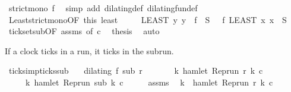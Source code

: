 \begin{isabellebody}
\ {\isacartoucheopen}strict{\isacharunderscore}mono\ f{\isacartoucheclose}\ \isamarkupfalse%
\ {\isacharparenleft}simp\ add{\isacharcolon}\ dilating{\isacharunderscore}def\ dilating{\isacharunderscore}fun{\isacharunderscore}def{\isacharparenright}\isanewline
\ \ \isamarkupfalse%
\ Least{\isacharunderscore}strict{\isacharunderscore}mono{\isacharbrackleft}OF\ this\ least{\isacharbrackright}\ \isamarkupfalse%
\isanewline
\ \ \ \ {\isacartoucheopen}{\isacharparenleft}LEAST\ y{\isachardot}\ y\ {\isasymin}\ f\ {\isacharbackquote}\ {\isacharquery}S{\isacharparenright}\ \ {\isacharequal}\ f\ {\isacharparenleft}LEAST\ x{\isachardot}\ x\ {\isasymin}\ {\isacharquery}S{\isacharparenright}{\isacartoucheclose}\ \isacommand{{\isachardot}}\isamarkupfalse%
\isanewline
\ \ \isamarkupfalse%
\ tick{\isacharunderscore}set{\isacharunderscore}sub{\isacharbrackleft}OF\ assms{\isacharparenleft}{}{\isacharparenright}{\isacharcomma}\ of\ {\isacartoucheopen}c{\isacartoucheclose}{\isacharbrackright}\ \isamarkupfalse%
\ {\isacharquery}thesis\ \isamarkupfalse%
\ auto\isanewline
{}\isamarkupfalse%
%
\endisatagproof
{\isafoldproof}%
%
\isadelimproof
%
\endisadelimproof
%
\begin{isamarkuptext}%
If a clock ticks in a run, it ticks in the subrun.%
\end{isamarkuptext}\isamarkuptrue%
\isamarkupfalse%
\ ticks{\isacharunderscore}imp{\isacharunderscore}ticks{\isacharunderscore}sub{\isacharcolon}\isanewline
\ \ \ {\isacartoucheopen}dilating\ f\ sub\ r{\isacartoucheclose}\isanewline
\ \ \ \ \ \ \ {\isacartoucheopen}{\isasymexists}k{\isachardot}\ hamlet\ {\isacharparenleft}{\isacharparenleft}Rep{\isacharunderscore}run\ r{\isacharparenright}\ k\ c{\isacharparenright}{\isacartoucheclose}\isanewline
\ \ \ \ \ {\isacartoucheopen}{\isasymexists}k\ hamlet\ {\isacharparenleft}{\isacharparenleft}Rep{\isacharunderscore}run\ sub{\isacharparenright}\ k\ c{\isacharparenright}{\isacartoucheclose}\isanewline
%
\isadelimproof
%
\endisadelimproof
%
\isatagproof
{}\isamarkupfalse%
\ {\isacharminus}\isanewline
\ \ \isamarkupfalse%
\ assms{\isacharparenleft}{}{\isacharparenright}\ \isamarkupfalse%
\ k\ \ {\isacartoucheopen}hamlet\ {\isacharparenleft}{\isacharparenleft}Rep{\isacharunderscore}run\ r{\isacharparenright}\ k\ c{\isacharparenright}{\isacartoucheclose}\ \isamarkupfalse%

\end{isabellebody}
